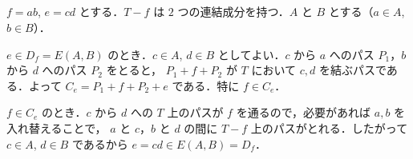 \subsection{}
$f=ab$, $e=cd$ とする．$T-f$ は $2$ つの連結成分を持つ．$A$ と $B$ とする（$a\in A$, $b\in B$）．

$e\in D_f = E(A,B)$ のとき．$c\in A$, $d\in B$ としてよい．$c$ から $a$ へのパス $P_1$，$b$ から $d$ へのパス $P_2$ をとると，
$P_1 + f + P_2$ が $T$ において $c,d$ を結ぶパスである．よって $C_e = P_1 + f + P_2 + e$ である．特に $f\in C_e$．

$f\in C_e$ のとき．$c$ から $d$ への $T$ 上のパスが $f$ を通るので，必要があれば $a, b$ を入れ替えることで，
$a$ と $c$，$b$ と $d$ の間に $T-f$ 上のパスがとれる．したがって $c\in A$, $d\in B$ であるから $e = cd\in E(A,B) = D_f$．